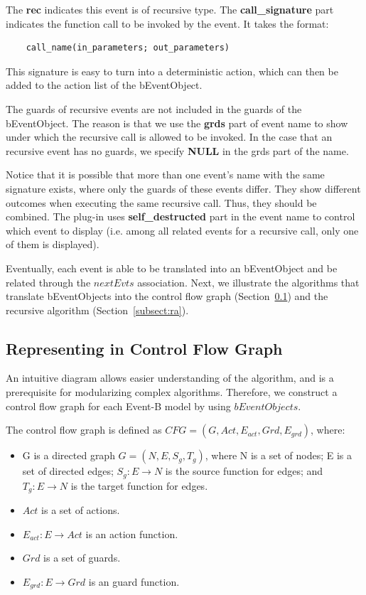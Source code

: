 \documentclass{easychair}
\begin{document}
The \textbf{rec} indicates this event is of recursive type. The \textbf{call\_signature} part indicates the function call to be invoked by the event. It takes the format:
\lstset{language=[68]Algol}
\begin{lstlisting}
	call_name(in_parameters; out_parameters)
\end{lstlisting} 
This signature is easy to turn into a deterministic action, which can then be added to the action list of the bEventObject. 

The guards of recursive events are not included in the guards of the bEventObject. The reason is that we use the \textbf{grds} part of event name to show under which the recursive call is allowed to be invoked. In the case that an recursive event has no guards, we specify \textbf{NULL} in the grds part of the name. 

Notice that it is possible that more than one event's name with the same signature exists, where only the guards of these events differ. They show different outcomes when executing the same recursive call. Thus, they should be combined. The plug-in uses \textbf{self\_destructed} part in the event name to control which event to display (i.e. among all related events for a recursive call, only one of them is displayed). 

Eventually, each event is able to be translated into an bEventObject and be related through the $nextEvts$ association. Next, we illustrate the algorithms that translate bEventObjects into the control flow graph (Section~\ref{subsect:vis}) and the recursive algorithm (Section~\ref{subsect:ra}).


\subsection{Representing in Control Flow Graph} \label{subsect:vis}
An intuitive diagram allows easier understanding of the algorithm, and is a prerequisite for modularizing complex algorithms. Therefore, we construct a control flow graph for each Event-B model by using $bEventObjects$.

The control flow graph is defined as $CFG = (G, Act, E_{act}, Grd, E_{grd})$, where:
\begin{itemize}
	\item G is a directed graph $G = (N, E, S_g, T_g)$, where N is a set of nodes; E is a set of directed edges; $S_g : E \rightarrow N $ is the source function for edges; and $T_g : E \rightarrow N$ is the target function for edges.
	\item $Act$ is a set of actions.
	\item $E_{act} : E \rightarrow Act$ is an action function. 
	\item $Grd$ is a set of guards.
	\item $E_{grd} : E \rightarrow Grd$ is an guard function.
\end{itemize}
\end{document}

